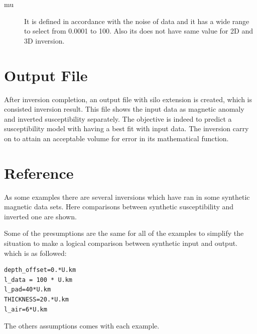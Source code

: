 \begin{description} 	

\item[mu]
It is defined in accordance with the noise of data and it has a wide range to select from 0.0001 to 100. Also its does not have same value for 2D and 3D inversion.

\end{description}

\section{Output File}

After inversion completion, an output file with silo extension is created, which is consisted inversion result. This file shows the input data as magnetic anomaly and inverted susceptibility separately. The objective is indeed to  predict a susceptibility model with having a best fit with input data. The inversion carry on to attain an acceptable volume for error in its mathematical function. 


\section{Reference}

As some examples there are several inversions which have ran in some synthetic magnetic data sets. Here comparisons between synthetic susceptibility and inverted one are shown.

Some of the presumptions are the same for all of the examples to simplify the situation to make a logical comparison between synthetic input and output. which is as followed:

\begin{verbatim}
depth_offset=0.*U.km
l_data = 100 * U.km
l_pad=40*U.km
THICKNESS=20.*U.km
l_air=6*U.km
\end{verbatim}

The others assumptions comes with each example.

